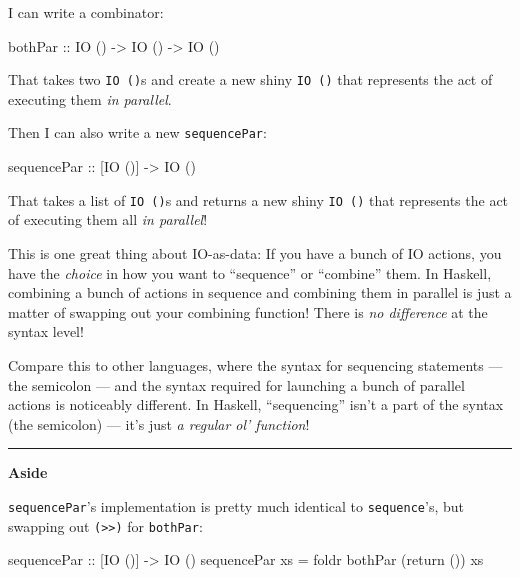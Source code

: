 \documentclass[]{article}
\newenvironment{Shaded}{}{}
\newcommand{\DataTypeTok}[1]{\textcolor[rgb]{0.56,0.13,0.00}{{#1}}}
\newcommand{\OtherTok}[1]{\textcolor[rgb]{0.00,0.44,0.13}{{#1}}}
\newcommand{\FunctionTok}[1]{\textcolor[rgb]{0.02,0.16,0.49}{{#1}}}
\newcommand{\NormalTok}[1]{{#1}}
\begin{document}
I can write a combinator:

\begin{Shaded}
\begin{Highlighting}[]
\OtherTok{bothPar ::} \DataTypeTok{IO} \NormalTok{() }\OtherTok{->} \DataTypeTok{IO} \NormalTok{() }\OtherTok{->} \DataTypeTok{IO} \NormalTok{()}
\end{Highlighting}
\end{Shaded}

That takes two \texttt{IO\ ()}s and create a new shiny \texttt{IO\ ()} that
represents the act of executing them \emph{in parallel}.

Then I can also write a new \texttt{sequencePar}:

\begin{Shaded}
\begin{Highlighting}[]
\OtherTok{sequencePar ::} \NormalTok{[}\DataTypeTok{IO} \NormalTok{()] }\OtherTok{->} \DataTypeTok{IO} \NormalTok{()}
\end{Highlighting}
\end{Shaded}

That takes a list of \texttt{IO\ ()}s and returns a new shiny \texttt{IO\ ()}
that represents the act of executing them all \emph{in parallel}!

This is one great thing about IO-as-data: If you have a bunch of IO actions, you
have the \emph{choice} in how you want to ``sequence'' or ``combine'' them. In
Haskell, combining a bunch of actions in sequence and combining them in parallel
is just a matter of swapping out your combining function! There is \emph{no
difference} at the syntax level!

Compare this to other languages, where the syntax for sequencing statements ---
the semicolon --- and the syntax required for launching a bunch of parallel
actions is noticeably different. In Haskell, ``sequencing'' isn't a part of the
syntax (the semicolon) --- it's just \emph{a regular ol' function}!

\begin{center}\rule{0.5\linewidth}{\linethickness}\end{center}

\textbf{Aside}

\texttt{sequencePar}'s implementation is pretty much identical to
\texttt{sequence}'s, but swapping out \texttt{(\textgreater{}\textgreater{})}
for \texttt{bothPar}:

\begin{Shaded}
\begin{Highlighting}[]
\OtherTok{sequencePar ::} \NormalTok{[}\DataTypeTok{IO} \NormalTok{()] }\OtherTok{->} \DataTypeTok{IO} \NormalTok{()}
\NormalTok{sequencePar xs }\FunctionTok{=} \NormalTok{foldr bothPar (return ()) xs}
\end{Highlighting}
\end{Shaded}
\end{document}
